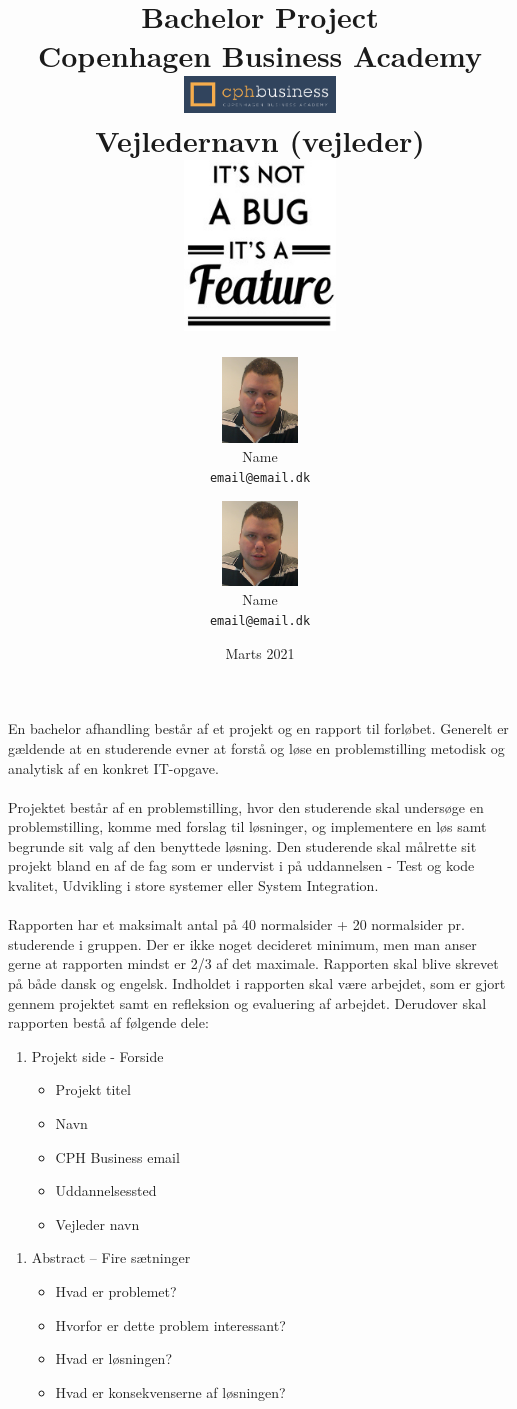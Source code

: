 \documentclass{report}
\title{
    {Bachelor Project}\\
    \vspace{1cm}
    {\large Copenhagen Business Academy}\\
    \vspace{0.25cm}
    \includegraphics[width=40mm]{coverpage/cph_business.png}\\
    {\large Vejledernavn (vejleder)}\\
    \vspace{1cm}
    \includegraphics[height=45mm]{coverpage/itisnotabugitisafeature.jpg}
}
\author{
    \includegraphics[width=20mm]{coverpage/morten_feldt.png} \\ Name \\ \texttt{email@email.dk} 
    \and 
    \includegraphics[width=20mm]{coverpage/morten_feldt.png} \\ Name \\ \texttt{email@email.dk}
}
\date{Marts 2021}
\begin{document}
  
    En bachelor afhandling består af et projekt og en rapport til forløbet. Generelt er gældende at en studerende evner at forstå og løse en problemstilling metodisk og analytisk af en konkret IT-opgave.\cite{bachelor_curriculum}   
    \\
    \\
    Projektet består af en problemstilling, hvor den studerende skal undersøge en problemstilling, komme med forslag til løsninger, og implementere en løs samt begrunde sit valg af den benyttede løsning. Den studerende skal målrette sit projekt bland en af de fag som er undervist i på uddannelsen - Test og kode kvalitet, Udvikling i store systemer eller System Integration.
    \\
    \\
    Rapporten har et maksimalt antal på 40 normalsider + 20 normalsider pr. studerende i gruppen. Der er ikke noget decideret minimum, men man anser gerne at rapporten mindst er 2/3 af det maximale. Rapporten skal blive skrevet på både dansk og engelsk. Indholdet i rapporten skal være arbejdet, som er gjort gennem projektet samt en refleksion og evaluering af arbejdet. Derudover skal rapporten bestå af følgende dele:\cite{bachelor_project} 
    \begin{enumerate}
        \item Projekt side - Forside
        \begin{itemize}
            \item Projekt titel
            \item Navn
            \item CPH Business email
            \item Uddannelsessted
            \item Vejleder navn
        \end{itemize}
    \end{enumerate}
    \begin{enumerate}
        \item Abstract – Fire sætninger
        \begin{itemize}
            \item Hvad er problemet?
            \item Hvorfor er dette problem interessant?
            \item Hvad er løsningen?
            \item Hvad er konsekvenserne af løsningen?
        \end{itemize}
    \end{enumerate}
\end{document}
